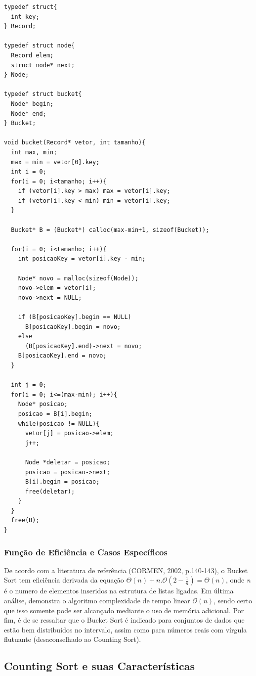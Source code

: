 \documentclass[a4paper, 12pt]{article}
\begin{document}
\begin{verbatim}
typedef struct{
  int key;
} Record;

typedef struct node{
  Record elem;
  struct node* next;
} Node;

typedef struct bucket{
  Node* begin;
  Node* end;
} Bucket;

void bucket(Record* vetor, int tamanho){
  int max, min;
  max = min = vetor[0].key;
  int i = 0;
  for(i = 0; i<tamanho; i++){
    if (vetor[i].key > max) max = vetor[i].key;
    if (vetor[i].key < min) min = vetor[i].key;
  }

  Bucket* B = (Bucket*) calloc(max-min+1, sizeof(Bucket));

  for(i = 0; i<tamanho; i++){
    int posicaoKey = vetor[i].key - min;
		
    Node* novo = malloc(sizeof(Node));
    novo->elem = vetor[i];
    novo->next = NULL;
		
    if (B[posicaoKey].begin == NULL)
      B[posicaoKey].begin = novo;
    else
      (B[posicaoKey].end)->next = novo;
    B[posicaoKey].end = novo;
  }

  int j = 0;
  for(i = 0; i<=(max-min); i++){
    Node* posicao;
    posicao = B[i].begin;
    while(posicao != NULL){
      vetor[j] = posicao->elem;
      j++;
			
      Node *deletar = posicao;
      posicao = posicao->next;
      B[i].begin = posicao;
      free(deletar);
    }
  }
  free(B);
}
\end{verbatim}

\subsubsection{Função de Eficiência e Casos Específicos}
\tab{} De acordo com a literatura de referência (CORMEN, 2002, p.140-143), o Bucket Sort tem eficiência derivada da equação $\Theta(n) + n.\mathcal{O} (2-\frac{1}{n}) = \Theta(n)$, onde \textit{n} é o numero de elementos inseridos na estrutura de listas ligadas. Em última análise, demonstra o algoritmo complexidade de tempo linear $\mathcal{O} (n)$, sendo certo que isso somente pode ser alcançado mediante o uso de memória adicional. Por fim, é de se ressaltar que o Bucket Sort é indicado para conjuntos de dados que estão bem distribuídos no intervalo, assim como para números reais com vírgula flutuante (desaconselhado ao Counting Sort).


\vspace{0.8cm}
\subsection{Counting Sort e suas Características}
\end{document}
